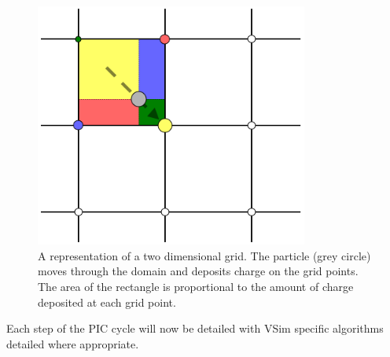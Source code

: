 \begin{figure}[H]
\centering
\includegraphics[width=0.8\textwidth]{grid}
\caption{A representation of a two dimensional grid. The particle (grey circle) moves through the domain and deposits charge on the grid points. The area of the rectangle is proportional to the amount of charge deposited at each grid point.}%
\label{fig:grid}
\end{figure}





Each step of the PIC cycle will now be detailed with VSim specific algorithms detailed where appropriate. %

